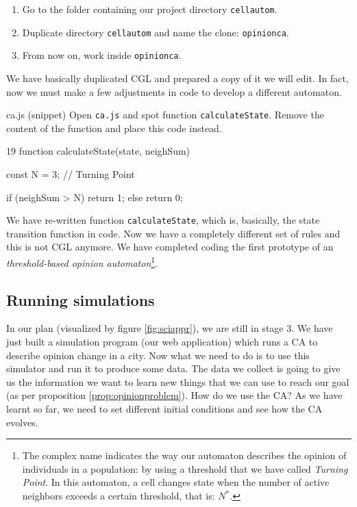 \begin{enumerate}
\item Go to the folder containing our project directory \texttt{cellautom}.
\item Duplicate directory \texttt{cellautom} and name the clone: \texttt{opinionca}.
\item From now on, work inside \texttt{opinionca}.
\end{enumerate}

We have basically duplicated CGL and prepared a copy of it we will edit. In fact, now we must
make a few adjustments in code to develop a different automaton.

\begin{programcode}{ca.js (snippet)}
Open \texttt{ca.js} and spot function \texttt{calculateState}. Remove the content of the
function and place this code instead.
\begin{codeh1}{1}{9}
function calculateState(state, neighSum) {
  const N = 3; // Turning Point

  if (neighSum > N) {
    return 1;
  } else {
    return 0;
  }
}
\end{codeh1}
\end{programcode}

We have re-written function \texttt{calculateState}, which is, basically, the state
transition function in code. Now we have a completely different set of rules and this is
not CGL anymore. We have completed coding the first prototype of an
\textit{threshold-based opinion automaton}\footnote{The complex name indicates the way
our automaton describes the opinion of individuals in a population: by using a threshold that we
have called \textit{Turning Point}. In this automaton, a cell changes state when the number
of active neighbors exceeds a certain threshold, that is: $N^\ast$.}.

\subsection{Running simulations}
In our plan (visualized by figure \ref{fig:sciappr}), we are still in stage 3. We have just built
a simulation program (our web application) which runs a CA to describe opinion change in a
city. Now what we need to do is to use this simulator and run it to produce some data. The data
we collect is going to give us the information we want to learn new things that we can use to reach
our goal (as per proposition \ref{prop:opinionproblem}). How do we use the CA? As we have learnt
so far, we need to set different initial conditions and see how the CA evolves.

